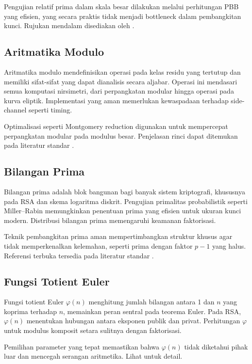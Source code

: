 \documentclass[../main.tex]{subfiles}
\begin{document}
Pengujian relatif prima dalam skala besar dilakukan melalui perhitungan PBB yang efisien, yang secara praktis tidak menjadi bottleneck dalam pembangkitan kunci. Rujukan mendalam disediakan oleh \textcite{menezes1996handbook}.

\subsection{Aritmatika Modulo}
Aritmatika modulo mendefinisikan operasi pada kelas residu yang tertutup dan memiliki sifat-sifat yang dapat dianalisis secara aljabar. Operasi ini mendasari semua komputasi nirsimetri, dari perpangkatan modular hingga operasi pada kurva eliptik. Implementasi yang aman memerlukan kewaspadaan terhadap side-channel seperti timing.

Optimalisasi seperti Montgomery reduction digunakan untuk mempercepat perpangkatan modular pada modulus besar. Penjelasan rinci dapat ditemukan pada literatur standar \parencite{menezes1996handbook}.

\subsection{Bilangan Prima}
Bilangan prima adalah blok bangunan bagi banyak sistem kriptografi, khususnya pada RSA dan skema logaritma diskrit. Pengujian primalitas probabilistik seperti Miller–Rabin memungkinkan penentuan prima yang efisien untuk ukuran kunci modern. Distribusi bilangan prima memengaruhi keamanan faktorisasi.

Teknik pembangkitan prima aman mempertimbangkan struktur khusus agar tidak memperkenalkan kelemahan, seperti prima dengan faktor \(p-1\) yang halus. Referensi terbuka tersedia pada literatur standar \parencite{menezes1996handbook}.

\subsection{Fungsi Totient Euler}
Fungsi totient Euler \(\varphi(n)\) menghitung jumlah bilangan antara 1 dan \(n\) yang koprima terhadap \(n\), memainkan peran sentral pada teorema Euler. Pada RSA, \(\varphi(n)\) menentukan hubungan antara eksponen publik dan privat. Perhitungan \(\varphi\) untuk modulus komposit setara sulitnya dengan faktorisasi.

Pemilihan parameter yang tepat memastikan bahwa \(\varphi(n)\) tidak diketahui pihak luar dan mencegah serangan aritmetika. Lihat \textcite{menezes1996handbook} untuk detail.
\end{document}
